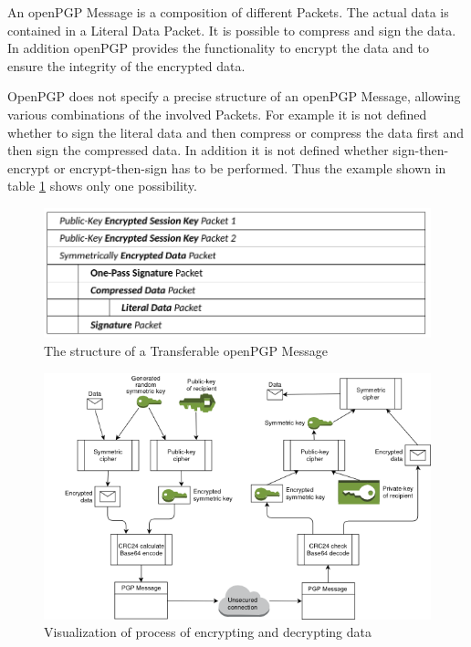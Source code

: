 An openPGP Message is a composition of different Packets. The actual data is contained in a Literal Data Packet. It is possible to compress and sign the data. In addition openPGP provides the functionality to encrypt the data and to ensure the integrity of the encrypted data.

OpenPGP does not specify a precise structure of an openPGP Message, allowing various combinations of the involved Packets. For example it is not defined whether to sign the literal data and then compress or compress the data first and then sign the compressed data. In addition it is not defined whether sign-then-encrypt or encrypt-then-sign has to be performed. Thus the example shown in table \ref{fig:transferable-msg} shows only one possibility.

\begin{figure}[h!]
	\centering
	\includegraphics[width=1\linewidth]{figures/transferable-msg.png}
	\caption{The structure of a Transferable openPGP Message}
	\label{fig:transferable-msg}
\end{figure}



\begin{figure}[h!]
	\centering
	\includegraphics[width=1\linewidth]{figures/encryption}
	\caption{Visualization of process of encrypting and decrypting data}
	\label{fig:encryption}
\end{figure}


